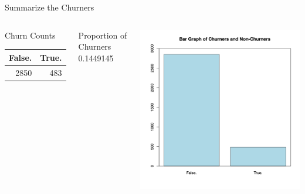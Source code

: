 \documentclass[handout]{beamer}
\begin{document}
\begin{frame}{Summarize the Churners}
\begin{columns}
    \begin{block}{Churn Counts}
    \begin{tabular}{rr}
    {\bf False.} & {\bf True.}\\
    \hline
    2850 & 483\\
    \end{tabular}
    \end{block}
    \begin{block}{Proportion of Churners}
    0.1449145
    \end{block}              
    \includegraphics[width=\textwidth]{images/bargraph-churners}
\end{columns}
\end{frame}
\end{document}

